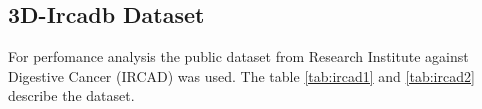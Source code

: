 \documentclass[11pt, oneside]{amsart}   	%
\begin{document}
\subsection{3D-Ircadb Dataset}

For perfomance analysis the public dataset from Research Institute against Digestive Cancer (IRCAD) \cite{ircadb} was used. The table \ref{tab:ircad1} and \ref{tab:ircad2} describe the dataset.

\begin{table}

\label{tab:ircad1}
\end{table}

\begin{table}

\label{tab:ircad2}
\end{table}

\clearpage{}

% 

\end{document}
